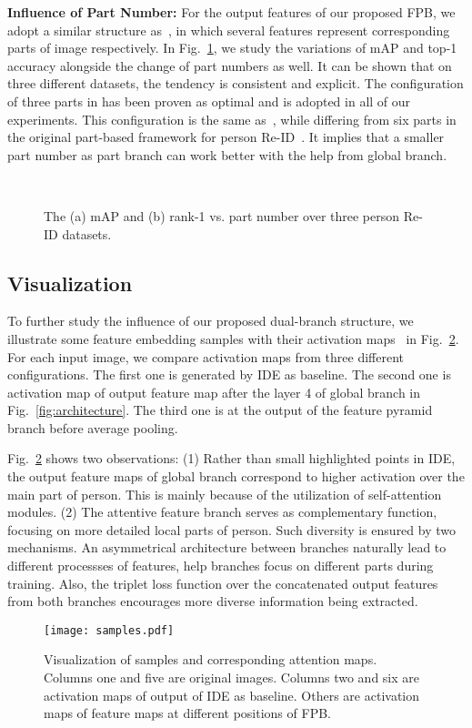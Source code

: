 \documentclass[journal]{IEEEtran}
\begin{document}
\textbf{Influence of Part Number:} For the output features  of our proposed FPB, we adopt a similar structure as~\cite{9094042}, in which several features represent corresponding parts of image respectively.
In Fig.~\ref{fig:partnumber}, we study the variations of mAP and top-1 accuracy alongside the change of part numbers as well.
It can be shown that on three different datasets, the tendency is consistent and explicit.
The configuration of three parts in  has been proven as optimal and is adopted in all of our experiments.
This configuration is the same as~\cite{9094042}, while differing from six parts in the original part-based framework for person Re-ID~\cite{sun2018beyond}. 
It implies that a smaller part number as part branch can work better with the help from global branch.
\begin{figure}
\centering
  \label{fig:maps_pn} \\
  \label{fig:r1_pn}
  \caption{The (a) mAP and (b) rank-1 vs. part number over three person Re-ID datasets.}
  \label{fig:partnumber}
\end{figure}

\subsection{Visualization}
\label{sec:visual}
To further study the influence of our proposed dual-branch structure, we illustrate some feature embedding samples with their activation maps~\cite{yang2019CAMA} in Fig.~\ref{fig:am}.
For each input image, we compare activation maps from three different configurations.
The first one is generated by IDE as baseline.
The second one is activation map of output feature map after the layer 4 of global branch in Fig.~\ref{fig:architecture}.
The third one is at the output of the feature pyramid branch before average pooling.

Fig.~\ref{fig:am} shows two observations: (1) Rather than small highlighted points in IDE, the output feature maps of global branch correspond to higher activation over the main part of person.
This is mainly because of the utilization of self-attention modules.
(2) The attentive feature branch serves as complementary function, focusing on more detailed local parts of person.
Such diversity is ensured by two mechanisms.
An asymmetrical architecture between branches naturally lead to different processses of features, help branches focus on different parts during training.
Also, the triplet loss function over the concatenated output features from both branches encourages more diverse information being extracted.
\begin{figure}
\centering
  \texttt{[image: samples.pdf]}
  \caption{Visualization of samples and corresponding attention maps.
  Columns one and five are original images.
  Columns two and six are activation maps of output of IDE as baseline.
  Others are activation maps of feature maps at different positions of FPB.}
  \label{fig:am}
\end{figure}
\end{document}
